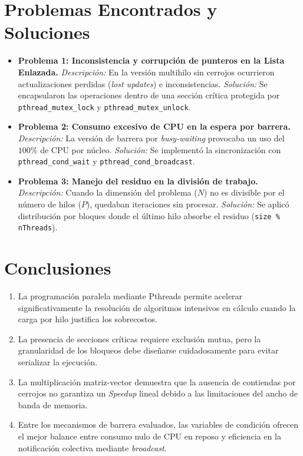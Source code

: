 \documentclass[11pt,a4paper]{article}
\begin{document}
\section{Problemas Encontrados y Soluciones}

\begin{itemize}
    \item \textbf{Problema 1: Inconsistencia y corrupción de punteros en la Lista Enlazada.}
    \textit{Descripción:} En la versión multihilo sin cerrojos ocurrieron actualizaciones perdidas (\textit{lost updates}) e inconsistencias.
    \textit{Solución:} Se encapsularon las operaciones dentro de una sección crítica protegida por \texttt{pthread\_mutex\_lock} y \texttt{pthread\_mutex\_unlock}.

    \item \textbf{Problema 2: Consumo excesivo de CPU en la espera por barrera.}
    \textit{Descripción:} La versión de barrera por \textit{busy-waiting} provocaba un uso del $100\%$ de CPU por núcleo.
    \textit{Solución:} Se implementó la sincronización con \texttt{pthread\_cond\_wait} y \texttt{pthread\_cond\_broadcast}.

    \item \textbf{Problema 3: Manejo del residuo en la división de trabajo.}
    \textit{Descripción:} Cuando la dimensión del problema ($N$) no es divisible por el número de hilos ($P$), quedaban iteraciones sin procesar.
    \textit{Solución:} Se aplicó distribución por bloques donde el último hilo absorbe el residuo (\texttt{size \% nThreads}).
\end{itemize}

\section{Conclusiones}

\begin{enumerate}
    \item La programación paralela mediante Pthreads permite acelerar significativamente la resolución de algoritmos intensivos en cálculo cuando la carga por hilo justifica los sobrecostos.
    \item La presencia de secciones críticas requiere exclusión mutua, pero la granularidad de los bloqueos debe diseñarse cuidadosamente para evitar serializar la ejecución.
    \item La multiplicación matriz-vector demuestra que la ausencia de contiendas por cerrojos no garantiza un \textit{Speedup} lineal debido a las limitaciones del ancho de banda de memoria.
    \item Entre los mecanismos de barrera evaluados, las variables de condición ofrecen el mejor balance entre consumo nulo de CPU en reposo y eficiencia en la notificación colectiva mediante \textit{broadcast}.
\end{enumerate}
\end{document}
